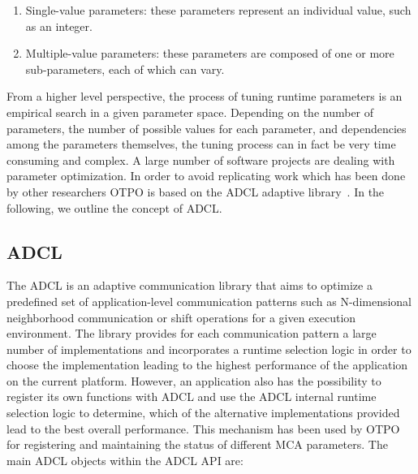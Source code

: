 \begin{enumerate}
\item Single-value parameters: these parameters represent an
  individual value, such as an integer.
\item Multiple-value parameters: these parameters are composed of
  one or more sub-parameters, each of which can vary.
\end{enumerate}

From a higher level perspective, the process of tuning runtime parameters is an empirical search in a given parameter space. Depending on the number of parameters, the number of possible values for each parameter, and dependencies among the parameters themselves, the tuning process can in fact be very time consuming and complex. A large number of software projects are dealing with parameter optimization. In order to avoid replicating work which has been done by other researchers OTPO is based on the ADCL adaptive library~\cite{ADCL}. In the following, we outline the concept of ADCL. 

\subsection{ADCL}

The ADCL is an adaptive communication library that aims to optimize a
predefined set of application-level communication patterns such as
N-dimensional neighborhood communication or shift operations for a
given execution environment. The library provides for each
communication pattern a large number of implementations and
incorporates a runtime selection logic in order to choose the
implementation leading to the highest performance of the application
on the current platform. However, an application also has the
possibility to register its own functions with ADCL and use the ADCL
internal runtime selection logic to determine, which of the
alternative implementations provided lead to the best overall
performance. This mechanism has been used by OTPO for registering and
maintaining the status of different MCA parameters. The main 
ADCL objects within the ADCL API are:

